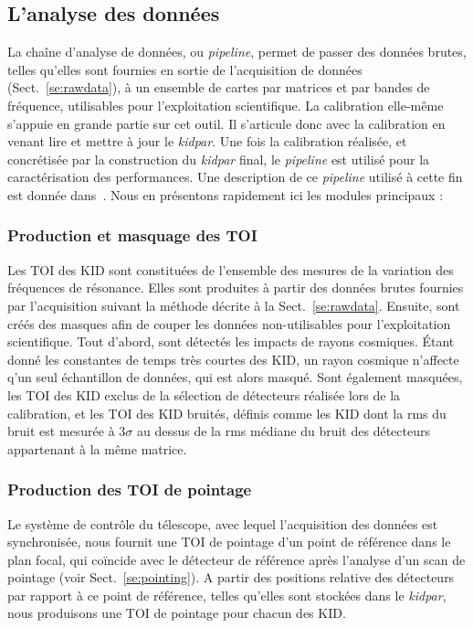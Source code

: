 \subsection{L'analyse des données}
\label{se:overview_pipeline}

La chaîne d'analyse de données, ou \emph{pipeline}, permet de passer
des données brutes, telles qu'elles sont fournies en sortie de
l'acquisition de données (Sect.~\ref{se:rawdata}), à un ensemble de
cartes par matrices et par bandes de fréquence, utilisables pour
l'exploitation scientifique. La calibration elle-même s'appuie en
grande partie sur cet outil. Il s'articule donc avec la calibration en
venant lire et mettre à jour le \emph{kidpar}. Une fois la calibration
réalisée, et concrétisée par la construction du \emph{kidpar} final,
le \emph{pipeline} est utilisé pour la caractérisation des
performances. Une description de ce \emph{pipeline} utilisé à cette
fin est donnée dans~\citet{Perotto2019}. Nous en présentons rapidement
ici les modules principaux :

\subsubsection{Production et masquage des TOI}
Les TOI des KID sont constituées de l'ensemble des mesures de la
variation des fréquences de résonance. Elles sont produites à partir
des données brutes fournies par l'acquisition suivant la méthode
décrite à la Sect.~\ref{se:rawdata}. Ensuite, sont créés des masques
afin de couper les données non-utilisables pour l'exploitation
scientifique. Tout d'abord, sont détectés les impacts de rayons
cosmiques. \'Etant donné les constantes de temps très courtes des
KID, un rayon cosmique n'affecte q'un seul échantillon de données,
qui est alors masqué. Sont également masquées, les TOI des KID exclus
de la sélection de détecteurs réalisée lors de la calibration, et
les TOI des KID bruités, définis comme les KID dont la rms du bruit
est mesurée à 3$\sigma$ au dessus de la rms médiane du bruit des
détecteurs appartenant à la même matrice.

\subsubsection{Production des TOI de pointage} Le système de contrôle du
télescope, avec lequel l'acquisition des données est synchronisée,
nous fournit une TOI de pointage d'un point de référence dans le
plan focal, qui coïncide avec le détecteur de référence après
l'analyse d'un scan de pointage (voir Sect.~\ref{se:pointing}). A
partir des positions relative des détecteurs par rapport à ce point
de référence, telles qu'elles sont stockées dans le \emph{kidpar},
nous produisons une TOI de pointage pour chacun des KID.

